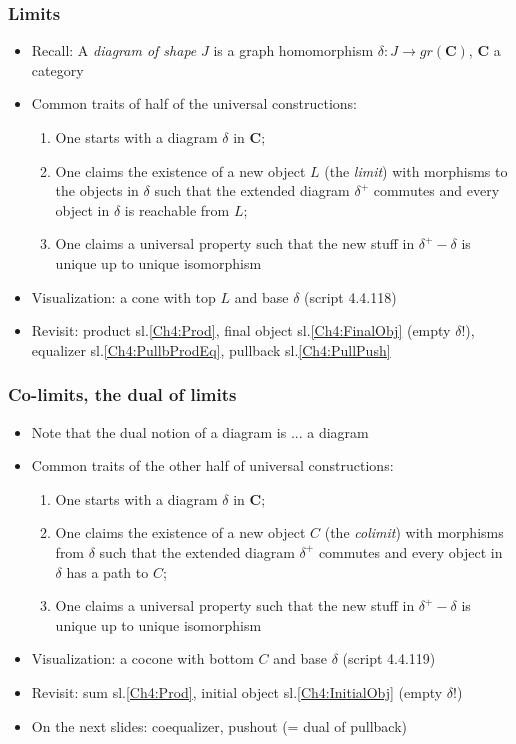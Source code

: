 \documentclass[handout]{beamer}
\newcommand{\bfsf}[1]{{\boldsymbol{#1}}}
\newcommand{\CC}{\bfsf{C}}
\begin{document}
\frame
  {   
    \frametitle{Limits}\label{Ch4:Limits}

 \begin{itemize}[<+->]
\item Recall: A \emph{diagram of shape} $J$ is a graph homomorphism
$\delta : J\to gr(\CC)$, $\CC$ a category
\item Common traits of half of the universal constructions:
 \begin{enumerate}
    \item One starts with a diagram $\delta$ in $\CC$;
    \item One claims the existence of a new object $L$ (the \emph{{\color{red}limit}}) with 
morphisms {\color{red}to} the objects in $\delta$ such that the extended 
diagram $\delta^+$ commutes
and every object in $\delta$ {\color{red} is reachable from} $L$;
    \item One claims a universal property such that the new stuff in
$\delta^+-\delta$ is unique up to unique isomorphism
 \end{enumerate}
\item Visualization: a cone with top $L$ and base $\delta$ (script 4.4.118)
\item Revisit: product sl.\ref{Ch4:Prod}, final object sl.\ref{Ch4:FinalObj} (empty $\delta$!), equalizer sl.\ref{Ch4:PullbProdEq}, pullback sl.\ref{Ch4:PullPush}

\end{itemize}

 }

\frame
  {   
    \frametitle{Co-limits, the dual of limits}\label{Ch4:CoLimits}

 \begin{itemize}[<+->]
\item Note that the dual notion of a diagram is ... a diagram
\item Common traits of the other half of universal constructions:
 \begin{enumerate}
    \item One starts with a diagram $\delta$ in $\CC$;
    \item One claims the existence of a new object $C$ (the \emph{{\color{red}colimit}}) with 
morphisms {\color{red}from} $\delta$ such that the extended diagram $\delta^+$ commutes
and every object in $\delta$ {\color{red} has a path to} $C$;
    \item One claims a universal property such that the new stuff in
$\delta^+-\delta$ is unique up to unique isomorphism
 \end{enumerate}
\item Visualization: a cocone with bottom $C$ and base $\delta$ (script 4.4.119)
\item Revisit: sum sl.\ref{Ch4:Prod}, initial object sl.\ref{Ch4:InitialObj} (empty $\delta$!)
\item On the next slides: coequalizer, pushout (= dual of pullback)

\end{itemize}

 }
\end{document}
